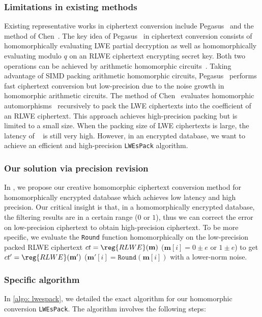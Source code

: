 \subsubsection{Limitations in existing methods}
Existing representative works in ciphertext conversion 
include Pegasus~\cite{pegasus} and 
the method of Chen~\cite{conversionhaochen}.
The key idea of Pegasus~\cite{pegasus} in ciphertext conversion 
consists of homomorphically evaluating LWE partial decryption as well as 
homomorphically evaluating modulo $q$ on an RLWE ciphertext encrypting secret key.
Both two operations can be achieved 
by arithmetic homomorphic circuits~\cite{helib,ckksbootsparse,ckksbootvariance}.
Taking advantage of SIMD packing arithmetic homomorphic circuits, 
Pegasus~\cite{pegasus}
performs fast ciphertext conversion but low-precision 
due to the noise growth in homomorphic arithmetic circuits.
The method of Chen~\cite{conversionhaochen} evaluates
homomorphic automorphisms~\cite{helib} recursively
to pack the LWE ciphertexts into the coefficient of an RLWE ciphertext.
This approach achieves high-precision packing but is 
limited to a small size.
When the packing size of LWE ciphertexts is large, 
the latency of ~\cite{conversionhaochen} is still very high.
However, in an encrypted database, we want to achieve an efficient 
and high-precision \texttt{LWEsPack} algorithm.

\subsubsection{Our solution via precision revision}
In \NAME, we propose our creative homomorphic ciphertext conversion method
for homomorphically encrypted database
which achieves low latency and high precision.
Our critical insight is that, in a homomorphically encrypted database, 
the filtering results are in a certain range ($0$ or $1$), 
thus we can correct the error on low-precision ciphertext to 
obtain high-precision ciphertext.
To be more specific, 
we evaluate the \texttt{Round} function homomorphically on
the low-precision packed RLWE ciphertext
$ct = \reg{RLWE}(\mathbf{m})$ ($\mathbf{m}[i] = 0\pm e$ or $1\pm e$)
to get $ct' = 
\reg{RLWE}(\mathbf{m'})$ ($\mathbf{m'}[i] = \texttt{Round}(\mathbf{m}[i])$
with a lower-norm noise.

\subsubsection{Specific algorithm}
In \cref{algo: lwespack}, we detailed the exact algorithm
for our homomorphic conversion \texttt{LWEsPack}.
The algorithm involves the following steps:

